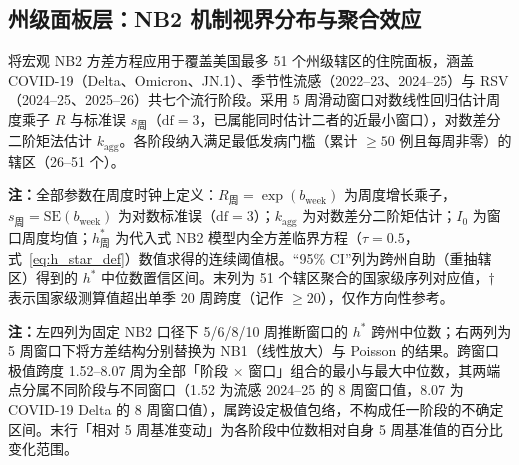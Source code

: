 \documentclass[10pt,UTF8,a4paper,zihao=-4]{ctexart}
\theoremstyle{plain}
\theoremstyle{remark}
\begin{document}
\subsection{州级面板层：NB2 机制视界分布与聚合效应}\label{sec:state_panel}

将宏观 NB2 方差方程应用于覆盖美国最多 51 个州级辖区的住院面板，涵盖 COVID-19（Delta、Omicron、JN.1）、季节性流感（2022--23、2024--25）与 RSV（2024--25、2025--26）共七个流行阶段。采用 5 周滑动窗口对数线性回归估计周度乘子 $R$ 与标准误 $s_{\text{周}}$（$\text{df}=3$，已属能同时估计二者的近最小窗口），对数差分二阶矩法估计 $k_{\text{agg}}$。各阶段纳入满足最低发病门槛（累计 $\ge 50$ 例且每周非零）的辖区（26--51 个）。

\begin{table}[htbp]
\centering
\scriptsize
\setlength{\tabcolsep}{2.5pt}
\caption{州级面板各阶段动力学参数与代入式 NB2 模型内机制视界分布}
\label{tab:horizons}

\vspace{2pt}
\begin{flushleft}
\scriptsize \textbf{注：}全部参数在周度时钟上定义：$R_{\text{周}}=\exp(b_{\text{week}})$ 为周度增长乘子，$s_{\text{周}}=\text{SE}(b_{\text{week}})$ 为对数标准误（$\text{df}=3$）；$k_{\text{agg}}$ 为对数差分二阶矩估计；$I_0$ 为窗口周度均值；$h^*_{\text{周}}$ 为代入式 NB2 模型内全方差临界方程（$\tau=0.5$，式~\eqref{eq:h_star_def}）数值求得的连续阈值根。“95\% CI”列为跨州自助（重抽辖区）得到的 $h^*$ 中位数置信区间。末列为 51 个辖区聚合的国家级序列对应值，$\dagger$ 表示国家级测算值超出单季 20 周跨度（记作 $\ge 20$），仅作方向性参考。
\end{flushleft}
\end{table}

\begin{table}[htbp]
\centering
\scriptsize
\setlength{\tabcolsep}{3pt}
\caption{推断窗口与替代方差口径下的机制视界中位数敏感性}
\label{tab:window_nb}

\vspace{2pt}
\begin{flushleft}
\scriptsize \textbf{注：}左四列为固定 NB2 口径下 5/6/8/10 周推断窗口的 $h^*$ 跨州中位数；右两列为 5 周窗口下将方差结构分别替换为 NB1（线性放大）与 Poisson 的结果。跨窗口极值跨度 1.52--8.07 周为全部「阶段 $\times$ 窗口」组合的最小与最大中位数，其两端点分属不同阶段与不同窗口（1.52 为流感 2024--25 的 8 周窗口值，8.07 为 COVID-19 Delta 的 8 周窗口值），属跨设定极值包络，不构成任一阶段的不确定区间。末行「相对 5 周基准变动」为各阶段中位数相对自身 5 周基准值的百分比变化范围。\end{flushleft}
\end{table}
\end{document}
